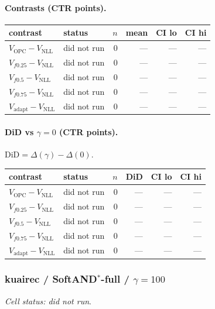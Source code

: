 \documentclass[10pt,a4paper]{article}
\begin{document}
\paragraph{Contrasts (CTR points).}
{\centering\small\begin{tabular}{llrrrr}
\toprule contrast & status & $n$ & mean & CI lo & CI hi \\
\midrule
$V_{\mathrm{OPC}}-V_{\mathrm{NLL}}$ & did not run & 0 & --- & --- & --- \\
$V_{f0.25}-V_{\mathrm{NLL}}$ & did not run & 0 & --- & --- & --- \\
$V_{f0.5}-V_{\mathrm{NLL}}$ & did not run & 0 & --- & --- & --- \\
$V_{f0.75}-V_{\mathrm{NLL}}$ & did not run & 0 & --- & --- & --- \\
$V_{\mathrm{adapt}}-V_{\mathrm{NLL}}$ & did not run & 0 & --- & --- & --- \\
\bottomrule\end{tabular}\par}
\paragraph{DiD vs $\gamma=0$ (CTR points).} $\mathrm{DiD}=\Delta(\gamma)-\Delta(0)$.
{\centering\small\begin{tabular}{llrrrr}
\toprule contrast & status & $n$ & DiD & CI lo & CI hi \\
\midrule
$V_{\mathrm{OPC}}-V_{\mathrm{NLL}}$ & did not run & 0 & --- & --- & --- \\
$V_{f0.25}-V_{\mathrm{NLL}}$ & did not run & 0 & --- & --- & --- \\
$V_{f0.5}-V_{\mathrm{NLL}}$ & did not run & 0 & --- & --- & --- \\
$V_{f0.75}-V_{\mathrm{NLL}}$ & did not run & 0 & --- & --- & --- \\
$V_{\mathrm{adapt}}-V_{\mathrm{NLL}}$ & did not run & 0 & --- & --- & --- \\
\bottomrule\end{tabular}\par}
\bigskip
\subsubsection{kuairec / SoftAND$^*$-full / $\gamma=100$}
\emph{Cell status: did not run}.
\end{document}
